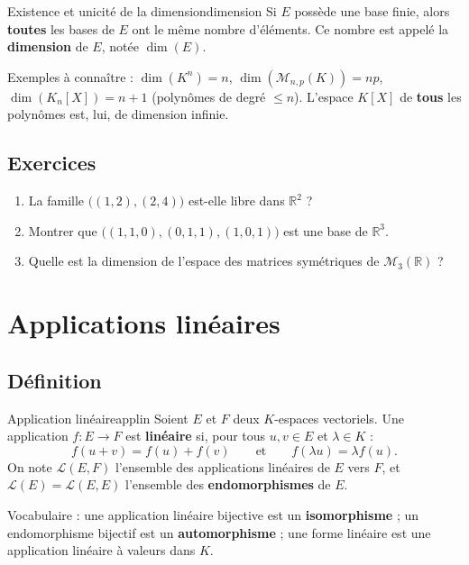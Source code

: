 \documentclass[theme=pringlea]{myrtille}
\begin{document}
\begin{myrthm}{Existence et unicité de la dimension}{dimension}
Si $E$ possède une base finie, alors \textbf{toutes} les bases de $E$ ont le même nombre d'éléments. Ce nombre est appelé la \textbf{dimension} de $E$, notée $\dim(E)$.
\end{myrthm}

\begin{infobox}
Exemples à connaître : $\dim(K^n) = n$, $\dim(\mathcal{M}_{n,p}(K)) = np$, $\dim(K_n[X]) = n+1$ (polynômes de degré $\leqslant n$). L'espace $K[X]$ de \textbf{tous} les polynômes est, lui, de dimension infinie.
\end{infobox}

\subsection{Exercices}
\begin{enumerate}
    \item La famille $\big((1,2), (2,4)\big)$ est-elle libre dans $\mathbb{R}^2$ ?
    \item Montrer que $\big((1,1,0), (0,1,1), (1,0,1)\big)$ est une base de $\mathbb{R}^3$.
    \item Quelle est la dimension de l'espace des matrices symétriques de $\mathcal{M}_3(\mathbb{R})$ ?
\end{enumerate}


\section{Applications linéaires}

\subsection{Définition}
\begin{myrdef}{Application linéaire}{applin}
Soient $E$ et $F$ deux $K$-espaces vectoriels. Une application $f : E \to F$ est \textbf{linéaire} si, pour tous $u,v \in E$ et $\lambda \in K$ :
\[ f(u+v) = f(u) + f(v) \qquad \text{et} \qquad f(\lambda u) = \lambda f(u). \]
On note $\mathcal{L}(E,F)$ l'ensemble des applications linéaires de $E$ vers $F$, et $\mathcal{L}(E) = \mathcal{L}(E,E)$ l'ensemble des \textbf{endomorphismes} de $E$.
\end{myrdef}

\begin{infobox}
Vocabulaire : une application linéaire bijective est un \textbf{isomorphisme} ; un endomorphisme bijectif est un \textbf{automorphisme} ; une forme linéaire est une application linéaire à valeurs dans $K$.
\end{infobox}
\end{document}
